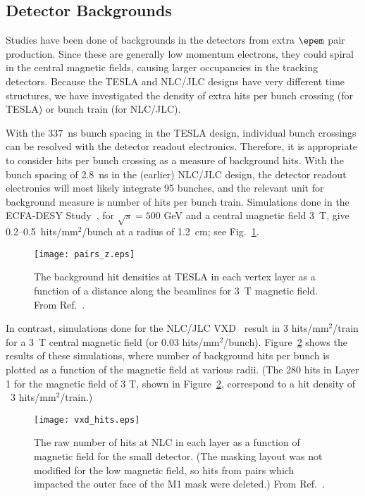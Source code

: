 \subsection{Detector Backgrounds}

\par  Studies have been done of backgrounds in the detectors from
extra $\epem$ pair production.  Since these are generally low momentum
electrons, they could spiral in the central magnetic fields, causing
larger occupancies in the tracking detectors.  
Because the TESLA and
NLC/JLC designs have very different time structures, we have 
investigated the density of
extra hits per bunch crossing (for TESLA) or bunch train (for NLC/JLC).

\par  With the 337~ns bunch spacing in the TESLA design, individual
bunch crossings can be resolved with the detector readout electronics. 
Therefore, it is appropriate to consider hits per bunch crossing 
as a measure of background hits.
With the bunch spacing of 2.8~ns in the (earlier) NLC/JLC design, 
the detector readout electronics will most likely integrate 
95 bunches, and the relevant unit for background measure is 
number of hits per bunch train.
Simulations done in the ECFA-DESY Study~\cite{ref-Eur_density},
for $\sqrt{s}=500$ GeV and a central magnetic field 3~T,
give 0.2--0.5~hits/mm$^2$/bunch at a radius of 1.2~cm; see
Fig.~\ref{1:fig:MB}.
%
\begin{figure}[bp]
\centering
	\texttt{[image: pairs\_z.eps]}
	\caption[1:fig:MB]{The background hit densities at TESLA in each 
	vertex layer as a function of a distance along the beamlines for 
	3~T magnetic field.  From Ref.~\cite{ref-Eur_density}.}
	\label{1:fig:MB}
\end{figure}
%
In contrast, simulations done for the
NLC/JLC VXD~\cite{ref-VXD_density} result in 3 hits/mm$^2$/train
for a 3~T central magnetic field (or 0.03 hits/mm$^2$/bunch).
Figure~\ref{2:fig:TWM} shows the results of these simulations, 
where number of background hits per bunch is plotted 
as a function of the magnetic field at various radii. 
(The 280 hits in Layer 1 for the magnetic field of 3 T, 
shown in Figure~\ref{2:fig:TWM}, correspond to a hit density of 
 ~3 hits/mm$^2$/train.) 
%
\begin{figure}
\centering
	\texttt{[image: vxd\_hits.eps]}
	\caption[2:fig:TWM]{The raw number of hits at NLC in each layer 
	as a function of magnetic field for the small detector.  (The
	masking layout was not modified for the low magnetic field, so 
	hits from pairs which impacted the outer face of the M1 mask were
	deleted.)  From Ref.~\cite{ref-VXD_density}.}
	\label{2:fig:TWM}
\end{figure}

